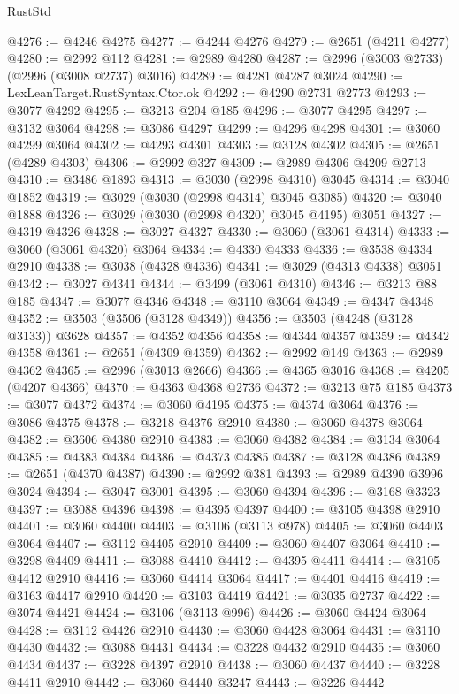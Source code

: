 \begin{lexlean}{RustStd}
\begin{coremodule}
@4276 := @4246 @4275
@4277 := @4244 @4276
@4279 := @2651 (@4211 @4277)
@4280 := @2992 @112
@4281 := @2989 @4280
@4287 := @2996 (@3003 @2733) (@2996 (@3008 @2737) @3016)
@4289 := @4281 @4287 @3024
@4290 := LexLeanTarget.RustSyntax.Ctor.ok
@4292 := @4290 @2731 @2773
@4293 := @3077 @4292
@4295 := @3213 @204 @185
@4296 := @3077 @4295
@4297 := @3132 @3064
@4298 := @3086 @4297
@4299 := @4296 @4298
@4301 := @3060 @4299 @3064
@4302 := @4293 @4301
@4303 := @3128 @4302
@4305 := @2651 (@4289 @4303)
@4306 := @2992 @327
@4309 := @2989 @4306 @4209 @2713
@4310 := @3486 @1893
@4313 := @3030 (@2998 @4310) @3045
@4314 := @3040 @1852
@4319 := @3029 (@3030 (@2998 @4314) @3045 @3085)
@4320 := @3040 @1888
@4326 := @3029 (@3030 (@2998 @4320) @3045 @4195) @3051
@4327 := @4319 @4326
@4328 := @3027 @4327
@4330 := @3060 (@3061 @4314)
@4333 := @3060 (@3061 @4320) @3064
@4334 := @4330 @4333
@4336 := @3538 @4334 @2910
@4338 := @3038 (@4328 @4336)
@4341 := @3029 (@4313 @4338) @3051
@4342 := @3027 @4341
@4344 := @3499 (@3061 @4310)
@4346 := @3213 @88 @185
@4347 := @3077 @4346
@4348 := @3110 @3064
@4349 := @4347 @4348
@4352 := @3503 (@3506 (@3128 @4349))
@4356 := @3503 (@4248 (@3128 @3133)) @3628
@4357 := @4352 @4356
@4358 := @4344 @4357
@4359 := @4342 @4358
@4361 := @2651 (@4309 @4359)
@4362 := @2992 @149
@4363 := @2989 @4362
@4365 := @2996 (@3013 @2666)
@4366 := @4365 @3016
@4368 := @4205 (@4207 @4366)
@4370 := @4363 @4368 @2736
@4372 := @3213 @75 @185
@4373 := @3077 @4372
@4374 := @3060 @4195
@4375 := @4374 @3064
@4376 := @3086 @4375
@4378 := @3218 @4376 @2910
@4380 := @3060 @4378 @3064
@4382 := @3606 @4380 @2910
@4383 := @3060 @4382
@4384 := @3134 @3064
@4385 := @4383 @4384
@4386 := @4373 @4385
@4387 := @3128 @4386
@4389 := @2651 (@4370 @4387)
@4390 := @2992 @381
@4393 := @2989 @4390 @3996 @3024
@4394 := @3047 @3001
@4395 := @3060 @4394
@4396 := @3168 @3323
@4397 := @3088 @4396
@4398 := @4395 @4397
@4400 := @3105 @4398 @2910
@4401 := @3060 @4400
@4403 := @3106 (@3113 @978)
@4405 := @3060 @4403 @3064
@4407 := @3112 @4405 @2910
@4409 := @3060 @4407 @3064
@4410 := @3298 @4409
@4411 := @3088 @4410
@4412 := @4395 @4411
@4414 := @3105 @4412 @2910
@4416 := @3060 @4414 @3064
@4417 := @4401 @4416
@4419 := @3163 @4417 @2910
@4420 := @3103 @4419
@4421 := @3035 @2737
@4422 := @3074 @4421
@4424 := @3106 (@3113 @996)
@4426 := @3060 @4424 @3064
@4428 := @3112 @4426 @2910
@4430 := @3060 @4428 @3064
@4431 := @3110 @4430
@4432 := @3088 @4431
@4434 := @3228 @4432 @2910
@4435 := @3060 @4434
@4437 := @3228 @4397 @2910
@4438 := @3060 @4437
@4440 := @3228 @4411 @2910
@4442 := @3060 @4440 @3247
@4443 := @3226 @4442

\end{coremodule}
\end{lexlean}
